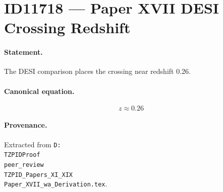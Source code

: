 \section*{ID11718 --- Paper XVII DESI Crossing Redshift}

\paragraph{Statement.}
The DESI comparison places the crossing near redshift 0.26.

\paragraph{Canonical equation.}
\[
z\approx0.26
\]

\paragraph{Provenance.}
Extracted from \texttt{D:\\TZPIDProof\\peer\_review\\TZPID\_Papers\_XI\_XIX\\Paper\_XVII\_wa\_Derivation.tex}.
